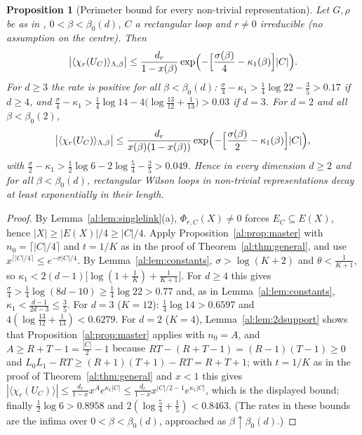 \documentclass[11pt,a4paper]{article}
\newtheorem{proposition}[theorem]{Proposition}
\theoremstyle{definition}
\theoremstyle{remark}
\newcommand{\Fname}[2]{\cite[#1~`#2']{F}}
\begin{document}
\begin{proposition}[Perimeter bound for every non-trivial representation]\label{al:prop:perimeter}
Let $G,\rho$ be as in \Fname{Convention}{Group}, $0<\beta<\beta_0(d)$, $C$ a rectangular loop and $r\neq0$ irreducible (no
assumption on the centre). Then
\[
\bigl|\langle\chi_r(U_C)\rangle_{\Lambda,\beta}\bigr|\le\frac{d_r}{1-x(\beta)}\exp\Bigl(-\Bigl[\frac{\sigma(\beta)}4-\kappa_1(\beta)\Bigr]|C|\Bigr).
\]
For $d\ge3$ the rate is positive for all $\beta<\beta_0(d)$: $\frac\sigma4-\kappa_1>\frac14\log22-\frac35>0.17$ if $d\ge4$, and
$\frac\sigma4-\kappa_1>\frac14\log14-4\bigl(\log\frac{13}{12}+\frac1{13}\bigr)>0.03$ if $d=3$. For $d=2$ and all $\beta<\beta_0(2)$,
\[
\bigl|\langle\chi_r(U_C)\rangle_{\Lambda,\beta}\bigr|\le\frac{d_r}{x(\beta)(1-x(\beta))}\exp\Bigl(-\Bigl[\frac{\sigma(\beta)}2-\kappa_1(\beta)\Bigr]|C|\Bigr),
\]
with $\frac\sigma2-\kappa_1>\frac12\log6-2\log\frac54-\frac25>0.049$.
Hence in every dimension $d\ge2$ and for all $\beta<\beta_0(d)$, rectangular Wilson loops in non-trivial representations decay at
least exponentially in their length.
\end{proposition}

\begin{proof}
By Lemma~\ref{al:lem:singlelink}(a), $\Phi_{r,C}(X)\neq0$ forces $E_C\subseteq E(X)$, hence $|X|\ge|E(X)|/4\ge|C|/4$.
Apply Proposition~\ref{al:prop:master} with $n_0=\lceil|C|/4\rceil$ and $t=1/K$ as in the proof of
Theorem~\ref{al:thm:general}, and use $x^{\lceil|C|/4\rceil}\le e^{-\sigma|C|/4}$. By Lemma~\ref{al:lem:constants},
$\sigma>\log(K+2)$ and $\theta<\frac1{K+1}$, so $\kappa_1<2(d-1)\bigl[\log(1+\frac1K)+\frac1{K+1}\bigr]$. For $d\ge4$ this gives
$\frac\sigma4>\frac14\log(8d-10)\ge\frac14\log22>0.77$ and, as in Lemma~\ref{al:lem:constants}, $\kappa_1<\frac{d-1}{2d-3}\le\frac35$.
For $d=3$ ($K=12$): $\frac14\log14>0.6597$ and $4(\log\frac{13}{12}+\frac1{13})<0.6279$. For $d=2$ ($K=4$),
Lemma~\ref{al:lem:2dsupport} shows that Proposition~\ref{al:prop:master} applies with $n_0=A$, and
$A\ge R+T-1=\frac{|C|}2-1$ because $RT-(R+T-1)=(R-1)(T-1)\ge0$ and $L_0L_1-RT\ge(R+1)(T+1)-RT=R+T+1$; with $t=1/K$ as in the proof of
Theorem~\ref{al:thm:general} and $x<1$ this gives
$|\langle\chi_r(U_C)\rangle|\le\frac{d_r}{1-x}x^{A}e^{\kappa_1|C|}\le\frac{d_r}{1-x}x^{|C|/2-1}e^{\kappa_1|C|}$, which is the
displayed bound; finally $\frac12\log6>0.8958$ and $2(\log\frac54+\frac15)<0.8463$. (The rates in these bounds are the infima over
$0<\beta<\beta_0(d)$, approached as $\beta\uparrow\beta_0(d)$.)
\end{proof}
\end{document}
